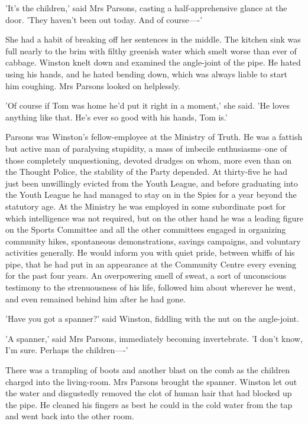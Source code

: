 \documentclass{article}
\begin{document}
'It's the children,' said Mrs Parsons, casting a half-apprehensive glance
at the door. 'They haven't been out today. And of course----'

She had a habit of breaking off her sentences in the middle. The kitchen
sink was full nearly to the brim with filthy greenish water which smelt
worse than ever of cabbage. Winston knelt down and examined the angle-joint
of the pipe. He hated using his hands, and he hated bending down, which was
always liable to start him coughing. Mrs Parsons looked on helplessly.

'Of course if Tom was home he'd put it right in a moment,' she said.
'He loves anything like that. He's ever so good with his hands, Tom is.'

Parsons was Winston's fellow-employee at the Ministry of Truth. He was
a fattish but active man of paralysing stupidity, a mass of imbecile
enthusiasms--one of those completely unquestioning, devoted drudges on
whom, more even than on the Thought Police, the stability of the Party
depended. At thirty-five he had just been unwillingly evicted from the
Youth League, and before graduating into the Youth League he had managed to
stay on in the Spies for a year beyond the statutory age. At the Ministry
he was employed in some subordinate post for which intelligence was not
required, but on the other hand he was a leading figure on the Sports
Committee and all the other committees engaged in organizing community
hikes, spontaneous demonstrations, savings campaigns, and voluntary
activities generally. He would inform you with quiet pride, between whiffs
of his pipe, that he had put in an appearance at the Community Centre every
evening for the past four years. An overpowering smell of sweat, a sort of
unconscious testimony to the strenuousness of his life, followed him about
wherever he went, and even remained behind him after he had gone.

'Have you got a spanner?' said Winston, fiddling with the nut on the
angle-joint.

'A spanner,' said Mrs Parsons, immediately becoming invertebrate. 'I don't
know, I'm sure. Perhaps the children----'

There was a trampling of boots and another blast on the comb as the
children charged into the living-room. Mrs Parsons brought the spanner.
Winston let out the water and disgustedly removed the clot of human hair
that had blocked up the pipe. He cleaned his fingers as best he could in
the cold water from the tap and went back into the other room.
\end{document}

